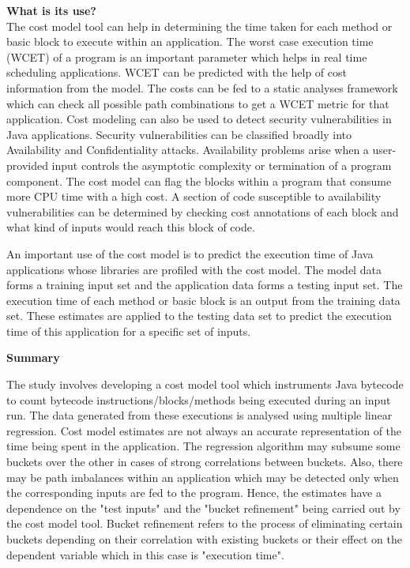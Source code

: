 \documentclass[11pt]{article}
\begin{document}
\textbf{What is its use?}\newline
\\The cost model tool can help in determining the time taken for each method or basic block to execute within an application. The worst case execution time (WCET) of a program is an important parameter which helps in real time scheduling applications. WCET can be predicted with the help of cost information from the model. The costs can be fed to a static analyses framework which can check all possible path combinations to get a WCET metric for that application. Cost modeling can also be used to detect security vulnerabilities in Java applications. Security vulnerabilities can be classified broadly into Availability and Confidentiality attacks. Availability problems arise when a user-provided input controls the asymptotic complexity or termination of a program component. The cost model can flag the blocks within a program that consume more CPU time with a high cost. A section of code susceptible to availability vulnerabilities can be determined by checking cost annotations of each block and what kind of inputs would reach this block of code.\newline

An important use of the cost model is to predict the execution time of Java applications whose libraries are profiled with the cost model. The model data forms a training input set and the application data forms a testing input set. The execution time of each method or basic block is an output from the training data set. These estimates are applied to the testing data set to predict the execution time of this application for a specific set of inputs.\newline

\textbf{Summary}\newline

The study involves developing a cost model tool which instruments Java bytecode to count bytecode instructions/blocks/methods being executed during an input run. The data generated from these executions is analysed using multiple linear regression. Cost model estimates are not always an accurate representation of the time being spent in the application. The regression algorithm may subsume some buckets over the other in cases of strong correlations between buckets. Also, there may be path imbalances within an application which may be detected only when the corresponding inputs are fed to the program. Hence, the estimates have a dependence on the "test inputs" and the "bucket refinement" being carried out by the cost model tool. Bucket refinement refers to the process of eliminating certain buckets depending on their correlation with existing buckets or their effect on the dependent variable which in this case is "execution time".
\end{document}
